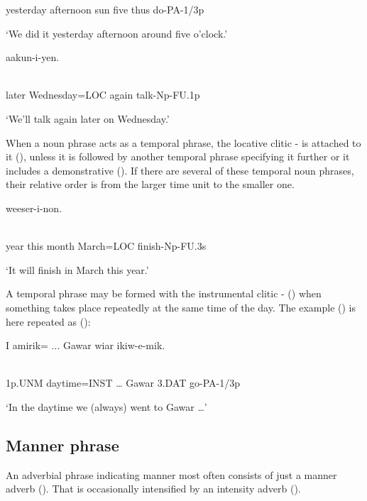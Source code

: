 yesterday  afternoon  sun  five  thus  do-PA-1/3p

`We did it yesterday afternoon around five o'clock.'

\ea%
\label{ex:x876}
\gll {} aakun-i-yen. \\
      \\
\glt
\z

later  Wednesday=LOC  again  talk-Np-FU.1p

`We'll talk again later on Wednesday.'

When a noun phrase acts as a temporal phrase, the locative clitic - is attached to it (), unless it is followed by another temporal phrase specifying it further or it includes a demonstrative (). If there are several of these temporal noun phrases, their relative order is from the larger time unit to the smaller one. 

\ea%
\label{ex:x878}
\gll {}  weeser-i-non. \\
      \\
\glt
\z

year  this  month  March=LOC  finish-Np-FU.3s

`It will finish in March this year.' 

A temporal phrase may be formed with the instrumental clitic - () when something takes place repeatedly at the same time of the day. The example () is here repeated as ():

\ea%
\label{ex:x1907}
\gll I  amirik=  ...  Gawar  wiar  ikiw-e-mik. \\
      \\
\glt
\z

1p.UNM  daytime=INST  {\dots}  Gawar  3.DAT  go-PA-1/3p

`In the daytime we (always) went to Gawar {\dots}'

\subsection{Manner phrase}
{}
An adverbial phrase indicating manner most often consists of just a manner adverb ().  That is occasionally intensified by an intensity adverb (). 

